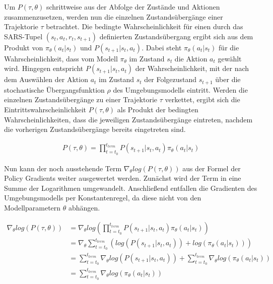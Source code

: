 Um $P(\tau, \theta)$ schrittweise aus der Abfolge der Zustände und Aktionen
zusammenzusetzen, werden nun die einzelnen Zustandsübergänge einer Trajektorie $\tau$
betrachtet. Die bedingte Wahrscheinlichkeit für einen durch das SARS-Tupel
$(s_t, a_t, r_t, s_{t+1})$ definierten Zustandsübergang ergibt sich aus dem Produkt von
$\pi_\theta(a_t | s_t)$ und $P(s_{t+1} | s_t, a_t)$.
Dabei steht $\pi_\theta(a_t | s_t)$ für die Wahrscheinlichkeit, dass vom Modell $\pi_\theta$
im Zustand $s_t$ die Aktion $a_t$ gewählt wird. Hingegen entspricht $P(s_{t+1} | s_t, a_t)$
der Wahrscheinlichkeit, mit der nach dem Auswählen der Aktion $a_t$ im Zustand $s_t$ der
Folgezustand $s_{t+1}$ über die stochastische Übergangsfunktion $\rho$ des Umgebungsmodells
eintritt. Werden die einzelnen Zustandsübergänge zu einer Trajektorie $\tau$ verkettet,
ergibt sich die Eintrittswahrscheinlichkeit $P(\tau, \theta)$ als Produkt der bedingten
Wahrscheinlichkeiten, dass die jeweiligen Zustandsübergänge eintreten, nachdem
die vorherigen Zustandsübergänge bereits eingetreten sind.

\begin{equation}
\begin{aligned}
P(\tau, \theta) = \prod_{t=t_0}^{t_{term}} P(s_{t+1} | s_t, a_t) \pi_\theta(a_t | s_t)
\end{aligned}
\end{equation}

Nun kann der noch ausstehende Term $\nabla_\theta log(P(\tau, \theta))$ aus
der Formel der Policy Gradients weiter ausgewertet werden. Zunächst wird der Term
in eine Summe der Logarithmen umgewandelt. Anschließend entfallen die Gradienten
des Umgebungsmodells per Konstantenregel, da diese nicht von den Modellparametern
$\theta$ abhängen.

\begin{equation}
\begin{aligned}
\nabla_\theta log\left(P(\tau, \theta)\right)
&= \nabla_\theta log(\prod_{t=t_0}^{t_{term}} P(s_{t+1} | s_t, a_t) \pi_\theta(a_t | s_t))\\
&= \nabla_\theta \sum_{t=t_0}^{t_{term}}
    (log(P(s_{t+1} | s_t, a_t)) + log(\pi_\theta(a_t | s_t)))\\
&= \sum_{t=t_0}^{t_{term}} \nabla_\theta log(P(s_{t+1} | s_t, a_t))
    + \sum_{t=t_0}^{t_{term}} \nabla_\theta log(\pi_\theta(a_t | s_t))\\
&= \sum_{t=t_0}^{t_{term}} \nabla_\theta log(\pi_\theta(a_t | s_t))
\end{aligned}
\end{equation}

